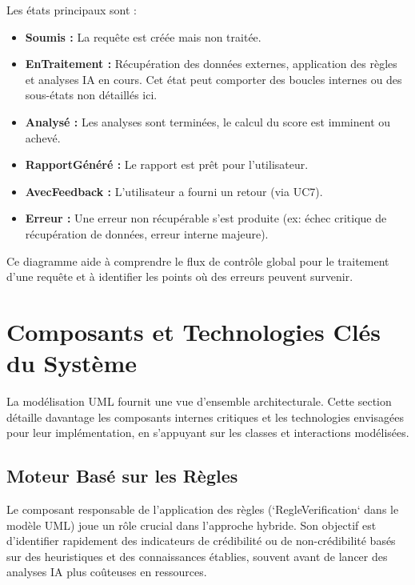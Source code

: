 \documentclass[9pt,twocolumn,french]{article}
\begin{document}
Les états principaux sont :
\begin{itemize}
    \item \textbf{Soumis :} La requête est créée mais non traitée.
    \item \textbf{EnTraitement :} Récupération des données externes, application des règles et analyses IA en cours. Cet état peut comporter des boucles internes ou des sous-états non détaillés ici.
    \item \textbf{Analysé :} Les analyses sont terminées, le calcul du score est imminent ou achevé.
    \item \textbf{RapportGénéré :} Le rapport est prêt pour l'utilisateur.
    \item \textbf{AvecFeedback :} L'utilisateur a fourni un retour (via UC7).
    \item \textbf{Erreur :} Une erreur non récupérable s'est produite (ex: échec critique de récupération de données, erreur interne majeure).
\end{itemize}
Ce diagramme aide à comprendre le flux de contrôle global pour le traitement d'une requête et à identifier les points où des erreurs peuvent survenir.

\section{Composants et Technologies Clés du Système}

La modélisation UML fournit une vue d'ensemble architecturale. Cette section détaille davantage les composants internes critiques et les technologies envisagées pour leur implémentation, en s'appuyant sur les classes et interactions modélisées.

\subsection{Moteur Basé sur les Règles}

Le composant responsable de l'application des règles (`RegleVerification` dans le modèle UML) joue un rôle crucial dans l'approche hybride. Son objectif est d'identifier rapidement des indicateurs de crédibilité ou de non-crédibilité basés sur des heuristiques et des connaissances établies, souvent avant de lancer des analyses IA plus coûteuses en ressources.
\end{document}
